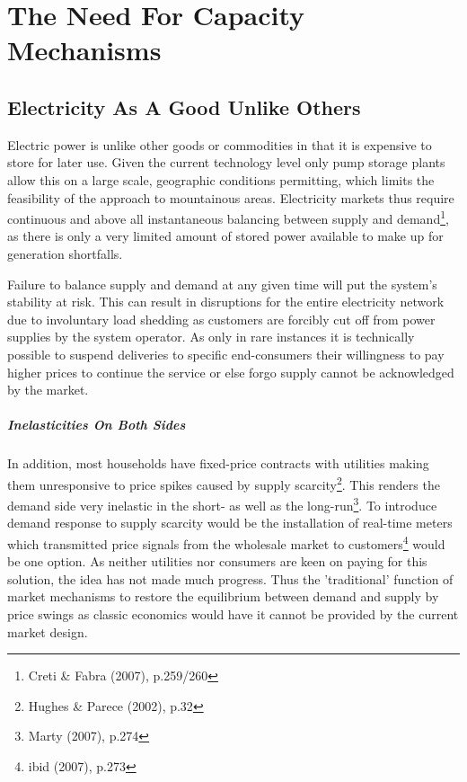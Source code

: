 \documentclass[11pt,a4paper,english]{scrreprt}
\begin{document}
	

	


\chapter{The Need For Capacity Mechanisms}	
	

  \section{Electricity As A Good Unlike Others}
  
   
Electric power is unlike other goods or commodities in that it is expensive
to store for later use. Given the current technology level only pump storage
plants allow this on a large scale, geographic conditions permitting, which
limits the feasibility of the approach to mountainous areas. Electricity
markets thus require continuous and above all instantaneous balancing between
supply and demand\footnote{Creti \& Fabra (2007), p.259/260}, as there is only
a very limited amount of stored power available to make up for generation
shortfalls.\par


Failure to balance supply and demand at any given time will put the system's
stability at risk. This can result in disruptions for the entire
electricity network due to involuntary load shedding as customers are
forcibly cut off from power supplies by the system operator. As only in rare
instances it is technically possible to suspend deliveries to specific
end-consumers their willingness to pay higher prices to continue the service or
else forgo supply cannot be acknowledged by the market.\par


	\paragraph{Inelasticities On Both Sides}

In addition, most households have fixed-price contracts with utilities making
them unresponsive to price spikes caused by supply scarcity\footnote{Hughes \&
Parece (2002), p.32}. This renders the demand side very inelastic in the short-
as well as the long-run\footnote{Marty (2007), p.274}.  To introduce demand
response to supply scarcity would be the installation of real-time meters which
transmitted price signals from the wholesale market to customers\footnote{ibid
(2007), p.273} would be one option. As neither utilities nor consumers are keen
on paying for this solution, the idea has not made much progress. Thus the
'traditional' function of market mechanisms to restore the equilibrium between
demand and supply by price swings as classic economics would have it cannot be
provided by the current market design.\par
  
\end{document}
